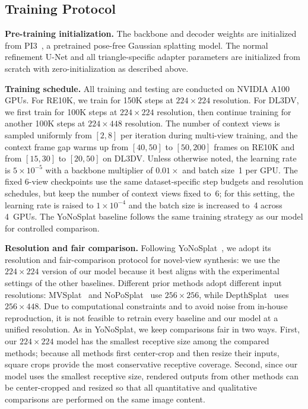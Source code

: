 \documentclass{llmxive}
\providecommand{\boldstart}[1]{\vspace{0.1in}\noindent\textbf{#1}}
\begin{document}
\subsection{Training Protocol}
\label{sec:app_training}

\boldstart{Pre-training initialization.}
The backbone and decoder weights are initialized from PI3~\citep{wang2025pi}, a pretrained pose-free Gaussian splatting model. The normal refinement U-Net and all triangle-specific adapter parameters are initialized from scratch with zero-initialization as described above.

\boldstart{Training schedule.}
All training and testing are conducted on NVIDIA A100 GPUs. For RE10K, we train for 150K steps at $224 \times 224$ resolution. For DL3DV, we first train for 100K steps at $224 \times 224$ resolution, then continue training for another 100K steps at $224 \times 448$ resolution. The number of context views is sampled uniformly from $[2, 8]$ per iteration during multi-view training, and the context frame gap warms up from $[40, 50]$ to $[50, 200]$ frames on RE10K and from $[15, 30]$ to $[20, 50]$ on DL3DV. Unless otherwise noted, the learning rate is $5 \times 10^{-5}$ with a backbone multiplier of $0.01\times$ and batch size~1 per GPU. The fixed 6-view checkpoints use the same dataset-specific step budgets and resolution schedules, but keep the number of context views fixed to~6; for this setting, the learning rate is raised to $1 \times 10^{-4}$ and the batch size is increased to~4 across 4~GPUs. The YoNoSplat baseline follows the same training strategy as our model for controlled comparison.

\boldstart{Resolution and fair comparison.}
Following YoNoSplat~\citep{ye2025yonosplat}, we adopt its resolution and fair-comparison protocol for novel-view synthesis: we use the $224 \times 224$ version of our model because it best aligns with the experimental settings of the other baselines. Different prior methods adopt different input resolutions: MVSplat~\citep{chen2024mvsplat} and NoPoSplat~\citep{ye2024no} use $256 \times 256$, while DepthSplat~\citep{xu2024depthsplat} uses $256 \times 448$. Due to computational constraints and to avoid noise from in-house reproduction, it is not feasible to retrain every baseline and our model at a unified resolution. As in YoNoSplat, we keep comparisons fair in two ways. First, our $224 \times 224$ model has the smallest receptive size among the compared methods; because all methods first center-crop and then resize their inputs, square crops provide the most conservative receptive coverage. Second, since our model uses the smallest receptive size, rendered outputs from other methods can be center-cropped and resized so that all quantitative and qualitative comparisons are performed on the same image content.
\end{document}
